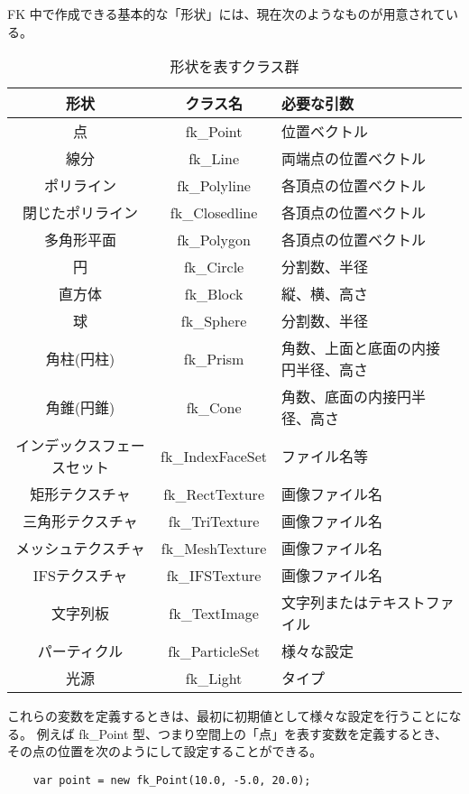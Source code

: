 FK 中で作成できる基本的な「形状」には、現在次のようなものが用意されている。
\begin{table}[H]
\caption{形状を表すクラス群}
\label{tbl:shapeclass}
\begin{small}
\begin{center}
\begin{tabular}{|c|c|l|}
\hline
形状 & クラス名 & 必要な引数 \\ \hline \hline
点 & fk\_Point & 位置ベクトル \\ \hline
線分 & fk\_Line & 両端点の位置ベクトル \\ \hline
ポリライン & fk\_Polyline & 各頂点の位置ベクトル \\ \hline
閉じたポリライン & fk\_Closedline & 各頂点の位置ベクトル \\ \hline
多角形平面 & fk\_Polygon & 各頂点の位置ベクトル \\ \hline
円 & fk\_Circle & 分割数、半径 \\ \hline
直方体 & fk\_Block & 縦、横、高さ \\ \hline
球 & fk\_Sphere & 分割数、半径 \\ \hline
角柱(円柱) & fk\_Prism & 角数、上面と底面の内接円半径、高さ \\ \hline
角錐(円錐) & fk\_Cone & 角数、底面の内接円半径、高さ \\ \hline
インデックスフェースセット & fk\_IndexFaceSet & ファイル名等 \\ \hline
矩形テクスチャ & fk\_RectTexture & 画像ファイル名 \\ \hline
三角形テクスチャ & fk\_TriTexture & 画像ファイル名 \\ \hline
メッシュテクスチャ & fk\_MeshTexture & 画像ファイル名 \\ \hline
IFSテクスチャ & fk\_IFSTexture & 画像ファイル名 \\ \hline
文字列板 & fk\_TextImage & 文字列またはテキストファイル \\ \hline
パーティクル & fk\_ParticleSet & 様々な設定 \\ \hline
光源 & fk\_Light & タイプ \\ \hline
\end{tabular}
\end{center}
\end{small}
\end{table}

これらの変数を定義するときは、最初に初期値として様々な設定を行うことになる。
例えば fk\_Point 型、つまり空間上の「点」を表す変数を定義するとき、
その点の位置を次のようにして設定することができる。
\\
\begin{screen}
\begin{verbatim}
    var point = new fk_Point(10.0, -5.0, 20.0);
\end{verbatim}
\end{screen}
\\

